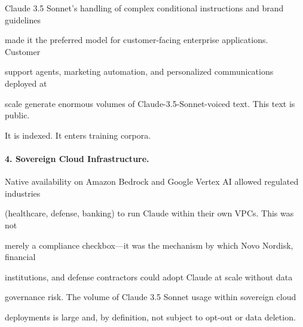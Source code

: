 Claude 3.5 Sonnet's handling of complex conditional instructions and brand guidelines





made it the preferred model for customer-facing enterprise applications. Customer





support agents, marketing automation, and personalized communications deployed at





scale generate enormous volumes of Claude-3.5-Sonnet-voiced text. This text is public.





It is indexed. It enters training corpora.











\paragraph{4. Sovereign Cloud Infrastructure.}





Native availability on Amazon Bedrock and Google Vertex AI allowed regulated industries





(healthcare, defense, banking) to run Claude within their own VPCs. This was not





merely a compliance checkbox---it was the mechanism by which Novo Nordisk, financial





institutions, and defense contractors could adopt Claude at scale without data





governance risk. The volume of Claude 3.5 Sonnet usage within sovereign cloud





deployments is large and, by definition, not subject to opt-out or data deletion.











